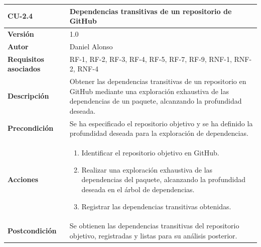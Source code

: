 \begin{table}[p]
	\centering
	\begin{tabularx}{\linewidth}{ p{} p{} }
		\toprule
		\textbf{CU-2.4}               & \textbf{Dependencias transitivas de un repositorio de GitHub}                                                                                                              \\
		\toprule
		\textbf{Versión}              & 1.0                                                                                                                                                                        \\
		\textbf{Autor}                & Daniel Alonso                                                                                                                                                              \\
		\textbf{Requisitos asociados} & RF-1, RF-2, RF-3, RF-4, RF-5, RF-7, RF-9, RNF-1, RNF-2, RNF-4                                                                                                              \\
		\textbf{Descripción}          & Obtener las dependencias transitivas de un repositorio en GitHub mediante una exploración exhaustiva de las dependencias de un paquete, alcanzando la profundidad deseada. \\
		\textbf{Precondición}         & Se ha especificado el repositorio objetivo y se ha definido la profundidad deseada para la exploración de dependencias.                                                    \\
		\textbf{Acciones}             & \begin{enumerate}
			                                \item Identificar el repositorio objetivo en GitHub.
			                                \item Realizar una exploración exhaustiva de las dependencias del paquete, alcanzando la profundidad deseada en el árbol de dependencias.
			                                \item Registrar las dependencias transitivas obtenidas.
		                                \end{enumerate}                                   \\
		\textbf{Postcondición}        & Se obtienen las dependencias transitivas del repositorio objetivo, registradas y listas para su análisis posterior.                                                        \\

\end{tabularx}
\end{table}
